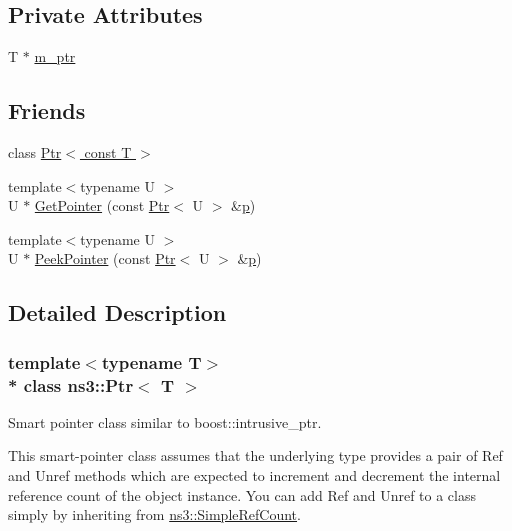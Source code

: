 \subsection*{Private Attributes}
\begin{DoxyCompactItemize}
\item 
T $\ast$ \hyperlink{classns3_1_1Ptr_af48a617408c972186d97c7e1ac4d5652}{m\+\_\+ptr}
\end{DoxyCompactItemize}
\subsection*{Friends}
\begin{DoxyCompactItemize}
\item 
class \hyperlink{classns3_1_1Ptr_a9eefe78c1d5aefe20553e12ea52117b6}{Ptr$<$ const T $>$}
\item 
{\footnotesize template$<$typename U $>$ }\\U $\ast$ \hyperlink{classns3_1_1Ptr_a27a6a8208868e66947c81f77f5bd751b}{Get\+Pointer} (const \hyperlink{classns3_1_1Ptr}{Ptr}$<$ U $>$ \&\hyperlink{lte__link__budget__x2__handover__measures_8m_ac9de518908a968428863f829398a4e62}{p})
\item 
{\footnotesize template$<$typename U $>$ }\\U $\ast$ \hyperlink{classns3_1_1Ptr_a9914221293005018082da554c6059d5e}{Peek\+Pointer} (const \hyperlink{classns3_1_1Ptr}{Ptr}$<$ U $>$ \&\hyperlink{lte__link__budget__x2__handover__measures_8m_ac9de518908a968428863f829398a4e62}{p})
\end{DoxyCompactItemize}


\subsection{Detailed Description}
\subsubsection*{template$<$typename T$>$\\*
class ns3\+::\+Ptr$<$ T $>$}

Smart pointer class similar to {\ttfamily boost\+::intrusive\+\_\+ptr}. 

This smart-\/pointer class assumes that the underlying type provides a pair of {\ttfamily Ref} and {\ttfamily Unref} methods which are expected to increment and decrement the internal reference count of the object instance. You can add {\ttfamily Ref} and {\ttfamily Unref} to a class simply by inheriting from \hyperlink{classns3_1_1SimpleRefCount}{ns3\+::\+Simple\+Ref\+Count}.

